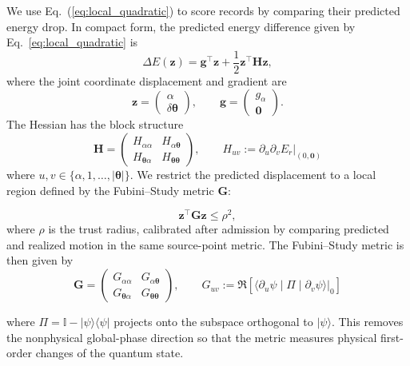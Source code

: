 \documentclass[
  reprint,
  amsmath,
  amssymb,
  aps,
  pra,
  nofootinbib,
  superscriptaddress,
  floatfix
]{revtex4-2}
\newcommand{\ket}[1]{|#1\rangle}
\newcommand{\bra}[1]{\langle #1|}
\begin{document}
We use Eq.~(\ref{eq:local_quadratic}) to score records by comparing their predicted energy drop. In compact form, the predicted energy difference given by Eq.~\eqref{eq:local_quadratic} is
\begin{equation}
\Delta E(\mathbf z)
=
\mathbf g^\top \mathbf z
+
\frac{1}{2}\mathbf z^\top \mathbf H\mathbf z,
\label{eq:compact_local_quadratic}
\end{equation}
where the joint coordinate displacement and gradient are
\begin{equation}
\mathbf z
=
\begin{pmatrix}
\alpha\\
\delta\boldsymbol{\theta}
\end{pmatrix},
\qquad
\mathbf g
=
\begin{pmatrix}
g_\alpha\\
\mathbf 0
\end{pmatrix}.
\end{equation}
The Hessian has the block structure
\begin{equation}
\mathbf H
=
\begin{pmatrix}
H_{\alpha\alpha} & H_{\alpha\boldsymbol\theta}\\
H_{\boldsymbol\theta\alpha} &
H_{\boldsymbol\theta\boldsymbol\theta}
\end{pmatrix}, \qquad
H_{uv}:=\left.\partial_u\partial_vE_r\right|_{(0,\mathbf 0)}
\label{eq:hessian_block_def}
\end{equation}
where \(u,v\in\{\alpha,1,\ldots,|\boldsymbol{\theta}|\}\). We restrict the
predicted displacement to a local region defined by the Fubini--Study metric
\(\mathbf G\):

\begin{equation}
\mathbf z^\top \mathbf G\mathbf z
\le
\rho^2,
\label{eq:fs_trust_region}
\end{equation}
where \(\rho\) is the trust radius, calibrated after admission by comparing
predicted and realized motion in the same source-point metric. The
Fubini--Study metric is then given by
\[
\mathbf G
=
\begin{pmatrix}
G_{\alpha\alpha} & G_{\alpha\boldsymbol\theta}\\
G_{\boldsymbol\theta\alpha} &
G_{\boldsymbol\theta\boldsymbol\theta}
\end{pmatrix}, \qquad G_{uv}:=\Re\!\left[\left.\langle \partial_u\psi \middle| \Pi \middle| \partial_v\psi\rangle\right|_0\right]
\]

where $\Pi=\mathbb I - \ket{\psi}\bra{\psi}$ projects onto the subspace
orthogonal to \(\ket{\psi}\). This removes the nonphysical global-phase
direction so that the metric measures physical first-order changes of the
quantum state.
\end{document}
